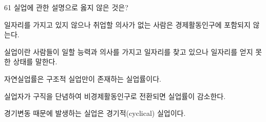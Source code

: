 \begin{question}{61}
실업에 관한 설명으로 옳지 않은 것은?
\begin{choices}
  \item 일자리를 가지고 있지 않으나 취업할 의사가 없는 사람은 경제활동인구에 포함되지 않는다.
  \item 실업이란 사람들이 일할 능력과 의사를 가지고 일자리를 찾고 있으나 일자리를 얻지 못한 상태를 말한다.
  \item 자연실업률은 구조적 실업만이 존재하는 실업률이다.
  \item 실업자가 구직을 단념하여 비경제활동인구로 전환되면 실업률이 감소한다.
  \item 경기변동 때문에 발생하는 실업은 경기적(cyclical) 실업이다.
\end{choices}
\end{question}
